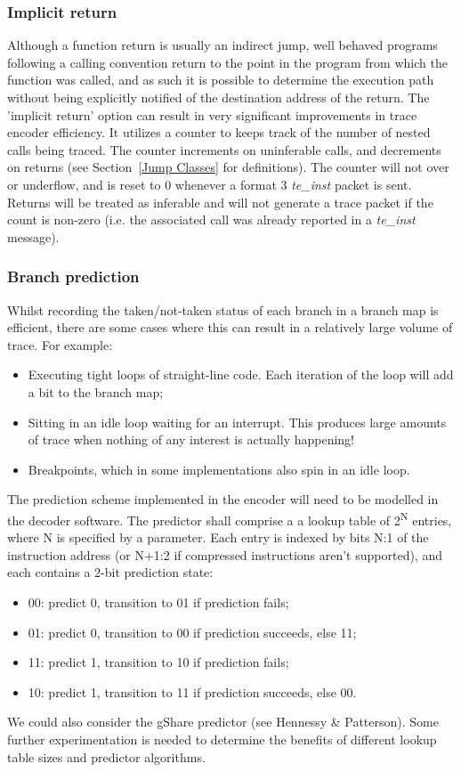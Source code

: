 \subsubsection{Implicit return}

Although a function return is usually an indirect jump, well behaved programs following a 
calling convention return to the point in the program from which the function was called, 
and as such it is possible to determine the execution path without being explicitly notified 
of the destination address of the return.  The 'implicit return' option can result in very 
significant improvements in trace encoder efficiency.  It utilizes a counter to 
keeps track of the number of nested calls being traced.  The counter increments on uninferable calls,
and decrements on returns (see Section~\ref{Jump Classes} for definitions).  The counter will not 
over or underflow, and is reset to 0 whenever a format 3 \textit{te\_inst} packet is sent.  Returns will be 
treated as inferable and will not generate a trace packet if the count is non-zero (i.e. the associated call 
was already reported in a \textit{te\_inst} message).

\subsubsection{Branch prediction} \label{sec:branch-prediction}

Whilst recording the taken/not-taken status of each branch in a branch map is efficient, there are 
some cases where this can result in a relatively large volume of trace.  For example:

\begin{itemize}
  \item Executing tight loops of straight-line code.  Each iteration of the loop will add a bit to the branch map;
  \item Sitting in an idle loop waiting for an interrupt.  This produces large amounts of trace when nothing of 
  any interest is actually happening!  
  \item Breakpoints, which in some implementations also spin in an idle loop.
\end{itemize}

The prediction scheme implemented in the encoder will need to be modelled in the decoder software.  
The predictor shall comprise a a lookup table of 2\textsuperscript{N} entries, where N is specified by a parameter.  
Each entry is indexed by bits N:1 of the instruction address (or N+1:2 if compressed instructions aren't supported), 
and each contains a 2-bit prediction state:
\begin{itemize}
  \item 00: predict 0, transition to 01 if prediction fails;
  \item 01: predict 0, transition to 00 if prediction succeeds, else 11;
  \item 11: predict 1, transition to 10 if prediction fails;
  \item 10: predict 1, transition to 11 if prediction succeeds, else 00.
\end{itemize}

We could also consider the gShare predictor (see Hennessy \& Patterson).  Some further experimentation is needed
to determine the benefits of different lookup table sizes and predictor algorithms.


